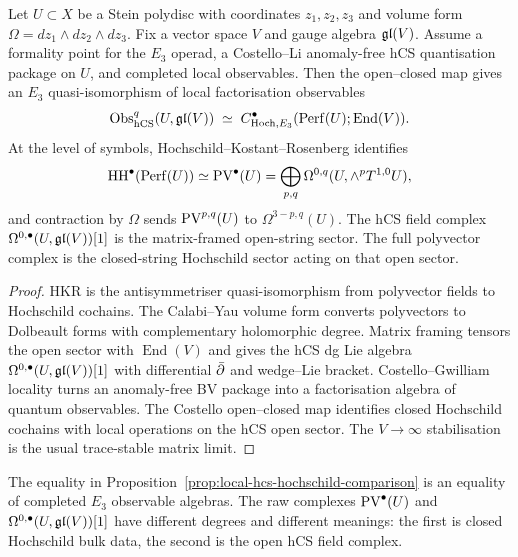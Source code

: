 \begin{proposition}
\label{prop:local-hcs-hochschild-comparison}
Let $U\subset X$ be a Stein polydisc with coordinates
$z_1,z_2,z_3$ and volume form
$\Omega=dz_1\wedge dz_2\wedge dz_3$. Fix a vector space $V$ and gauge
algebra $\mathfrak{gl}(V)$. Assume a formality point for the $E_3$ operad, a
Costello--Li anomaly-free hCS quantisation package on $U$, and completed
local observables. Then the open--closed map gives an $E_3$
quasi-isomorphism of local factorisation observables
\[
  \mathrm{Obs}_{\mathrm{hCS}}^{q}(U,\mathfrak{gl}(V))
  \;\simeq\;
  C^\bullet_{\mathrm{Hoch},E_3}(\mathrm{Perf}(U);\operatorname{End}(V)).
\]
At the level of symbols, Hochschild--Kostant--Rosenberg identifies
\[
  \mathrm{HH}^\bullet(\mathrm{Perf}(U))
  \simeq
  \mathrm{PV}^\bullet(U)
  =
  \bigoplus_{p,q}\Omega^{0,q}(U,\wedge^p T^{1,0}U),
\]
and contraction by $\Omega$ sends $\mathrm{PV}^{p,q}(U)$ to
$\Omega^{3-p,q}(U)$. The hCS field complex
$\Omega^{0,\bullet}(U,\mathfrak{gl}(V))[1]$ is the matrix-framed open-string
sector. The full polyvector complex is the closed-string Hochschild
sector acting on that open sector.
\end{proposition}

\begin{proof}
HKR is the antisymmetriser quasi-isomorphism from polyvector fields to
Hochschild cochains. The Calabi--Yau volume form converts polyvectors
to Dolbeault forms with complementary holomorphic degree. Matrix
framing tensors the open sector with $\operatorname{End}(V)$ and gives
the hCS dg Lie algebra
$\Omega^{0,\bullet}(U,\mathfrak{gl}(V))[1]$ with differential $\bar\partial$ and
wedge--Lie bracket. Costello--Gwilliam locality turns an anomaly-free
BV package into a factorisation algebra of quantum observables. The
Costello open--closed map identifies closed Hochschild cochains with
local operations on the hCS open sector. The $V\to\infty$ stabilisation
is the usual trace-stable matrix limit.
\end{proof}

\begin{remark}
\label{rmk:raw-complexes-observables}
The equality in Proposition~\ref{prop:local-hcs-hochschild-comparison}
is an equality of completed $E_3$ observable algebras. The raw complexes
$\mathrm{PV}^\bullet(U)$ and $\Omega^{0,\bullet}(U,\mathfrak{gl}(V))[1]$ have different
degrees and different meanings: the first is closed Hochschild bulk
data, the second is the open hCS field complex.
\end{remark}

